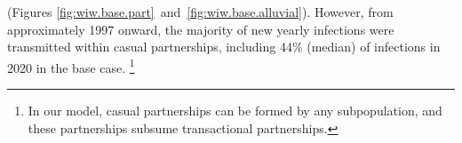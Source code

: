 (Figures \ref{fig:wiw.base.part}~and~\ref{fig:wiw.base.alluvial}).
However, from approximately 1997 onward,
the majority of new yearly infections were transmitted within casual partnerships, %
including 44\% (median) of infections in 2020 in the base case.%
\footnote{In our model, casual partnerships can be formed by any subpopulation,
  and these partnerships subsume transactional partnerships.}
